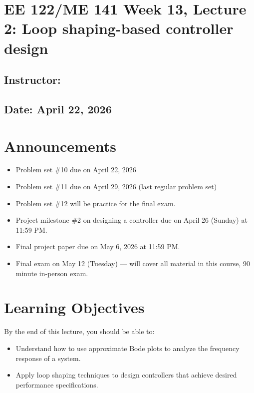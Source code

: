 \documentclass{ee122_notes}
\renewcommand{\releasedate}{April 22, 2026}
\begin{document}
\section*{EE 122/ME 141 Week 13, Lecture 2: Loop shaping-based controller design}
\subsection*{Instructor: \instructor}
\subsection*{Date: \releasedate}
\section{Announcements}
\begin{itemize}
    \item Problem set \#10 due on April 22, 2026 
    \item Problem set \#11 due on April 29, 2026 (last regular problem set)
    \item Problem set \#12 will be practice for the final exam.
    \item Project milestone \#2 on designing a controller due on April 26 (Sunday) at 11:59 PM.
    \item Final project paper due on May 6, 2026 at 11:59 PM.
    \item Final exam on May 12 (Tuesday) --- will cover all material in this course, 90 minute in-person exam.
\end{itemize}
\section{Learning Objectives}
By the end of this lecture, you should be able to:
\begin{itemize}
    \item Understand how to use approximate Bode plots to analyze the frequency response of a system.
    \item Apply loop shaping techniques to design controllers that achieve desired performance specifications.
\end{itemize}
\end{document}

